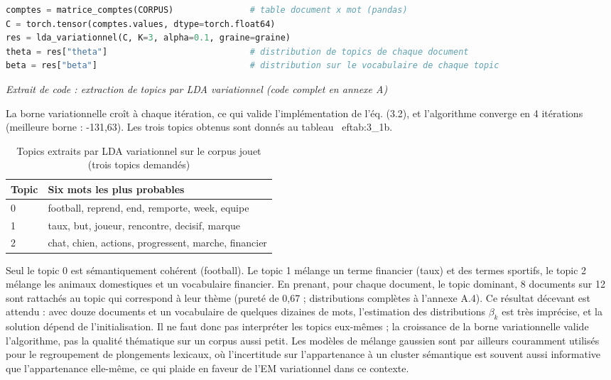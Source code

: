 \begin{lstlisting}[language=Python]
comptes = matrice_comptes(CORPUS)               # table document x mot (pandas)
C = torch.tensor(comptes.values, dtype=torch.float64)
res = lda_variationnel(C, K=3, alpha=0.1, graine=graine)
theta = res["theta"]                            # distribution de topics de chaque document
beta = res["beta"]                              # distribution sur le vocabulaire de chaque topic
\end{lstlisting}
\begin{center}\small\emph{Extrait de code : extraction de topics par LDA variationnel (code complet en annexe A)}\end{center}
La borne variationnelle croît à chaque itération, ce qui valide l'implémentation de l'éq. (3.2), et l'algorithme converge en 4 itérations (meilleure borne : -131,63). Les trois topics obtenus sont donnés au tableau~
ef{tab:3_1b}.

\begin{table}[H]
\centering
\small
\setlength{\tabcolsep}{0.14cm}
\begin{tabular}{|p{2.5cm}|p{12.3cm}|}
\hline
\textbf{Topic} & \textbf{Six mots les plus probables} \\
\hline
0 & football, reprend, end, remporte, week, equipe \\
\hline
1 & taux, but, joueur, rencontre, decisif, marque \\
\hline
2 & chat, chien, actions, progressent, marche, financier \\
\hline
\end{tabular}
\caption{Topics extraits par LDA variationnel sur le corpus jouet (trois topics demandés)}
\label{tab:3_1b}
\end{table}
Seul le topic 0 est sémantiquement cohérent (football). Le topic 1 mélange un terme financier (taux) et des termes sportifs, le topic 2 mélange les animaux domestiques et un vocabulaire financier. En prenant, pour chaque document, le topic dominant, 8 documents sur 12 sont rattachés au topic qui correspond à leur thème (pureté de 0,67 ; distributions complètes à l'annexe A.4). Ce résultat décevant est attendu : avec douze documents et un vocabulaire de quelques dizaines de mots, l'estimation des distributions $\beta _{k}$ est très imprécise, et la solution dépend de l'initialisation. Il ne faut donc pas interpréter les topics eux-mêmes ; la croissance de la borne variationnelle valide l'algorithme, pas la qualité thématique sur un corpus aussi petit. Les modèles de mélange gaussien sont par ailleurs couramment utilisés pour le regroupement de plongements lexicaux, où l'incertitude sur l'appartenance à un cluster sémantique est souvent aussi informative que l'appartenance elle-même, ce qui plaide en faveur de l'EM variationnel dans ce contexte.

